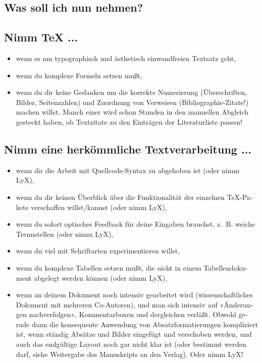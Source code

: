 \documentclass[11pt,a4paper,ngerman,french,DIV=8]{scrartcl}
\begin{document}
\begin{otherlanguage}{ngerman}
\section{Was soll ich nun nehmen?}

\subsection{Nimm \TeX{} ...}

\begin{itemize}
  \item wenn es um typographisch und ästhetisch einwandfreien Textsatz geht,
  \item wenn du komplexe Formeln setzen mußt,
  \item wenn du dir keine Gedanken um die korrekte Numerierung (Überschriften, Bilder, Seitenzahlen) und Zuordnung von Verweisen (Bibliographie-Zitate!) machen willst. Manch einer wird schon Stunden in den manuellen Abgleich gesteckt haben, ob Textzitate zu den Einträgen der Literaturliste passen!
\end{itemize}

\subsection{Nimm eine herkömmliche Textverarbeitung ...}

\begin{itemize}
  \item wenn dir die Arbeit mit Quellcode-Syntax zu abgehoben ist (oder nimm LyX),
  \item wenn du dir keinen Überblick über die Funktionalität der einzelnen \TeX{}-Pakete
verschaffen willst/kannst (oder nimm LyX),
  \item wenn du sofort optisches Feedback für deine Eingaben brauchst, z.~B. weiche
Trennstellen (oder nimm LyX),
\item wenn du viel mit Schriftarten experimentieren willst,
\item wenn du komplexe Tabellen setzen mußt, die nicht in einem Tabellendokument
abgelegt werden können (oder nimm LyX),
\item wenn an deinem Dokument noch intensiv gearbeitet wird (wissenschaftliches Dokument mit mehreren Co-Autoren), und man sich intensiv auf »Änderungen nachverfolgen«, Kommentarboxen und dergleichen verläßt. Obwohl gerade dann die konsequente Anwendung von Absatzformatierungen kompliziert ist\footnotemark{}, wenn ständig Absätze und Bilder eingefügt und verschoben werden, und auch das endgültige Layout noch gar nicht klar ist (oder bestimmt werden darf, siehe Weitergabe des Manuskripts an den Verlag). Oder nimm LyX!
\end{itemize}


\end{otherlanguage}
\end{document}
